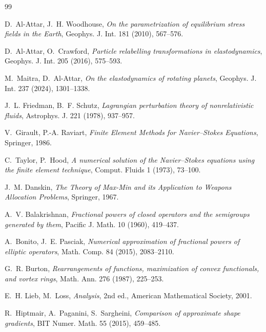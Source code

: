 \documentclass[11pt]{article}
\begin{document}
\begin{thebibliography}{99}

D.~Al-Attar, J.~H. Woodhouse,
\emph{On the parametrization of equilibrium stress fields in the Earth},
Geophys. J. Int. 181 (2010), 567--576.

D.~Al-Attar, O.~Crawford,
\emph{Particle relabelling transformations in elastodynamics},
Geophys. J. Int. 205 (2016), 575--593.

M.~Maitra, D.~Al-Attar,
\emph{On the elastodynamics of rotating planets},
Geophys. J. Int. 237 (2024), 1301--1338.

J.~L. Friedman, B.~F. Schutz,
\emph{Lagrangian perturbation theory of nonrelativistic fluids},
Astrophys. J. 221 (1978), 937--957.

V.~Girault, P.-A. Raviart,
\emph{Finite Element Methods for Navier--Stokes Equations},
Springer, 1986.

C.~Taylor, P.~Hood,
\emph{A numerical solution of the Navier--Stokes equations using the
finite element technique},
Comput. Fluids 1 (1973), 73--100.

J.~M. Danskin,
\emph{The Theory of Max-Min and its Application to Weapons Allocation
Problems},
Springer, 1967.

A.~V. Balakrishnan,
\emph{Fractional powers of closed operators and the semigroups generated
by them},
Pacific J. Math. 10 (1960), 419--437.

A.~Bonito, J.~E. Pasciak,
\emph{Numerical approximation of fractional powers of elliptic
operators},
Math. Comp. 84 (2015), 2083--2110.

G.~R. Burton,
\emph{Rearrangements of functions, maximization of convex functionals,
and vortex rings},
Math. Ann. 276 (1987), 225--253.

E.~H. Lieb, M.~Loss,
\emph{Analysis}, 2nd ed.,
American Mathematical Society, 2001.

R.~Hiptmair, A.~Paganini, S.~Sargheini,
\emph{Comparison of approximate shape gradients},
BIT Numer. Math. 55 (2015), 459--485.


\end{thebibliography}
\end{document}
